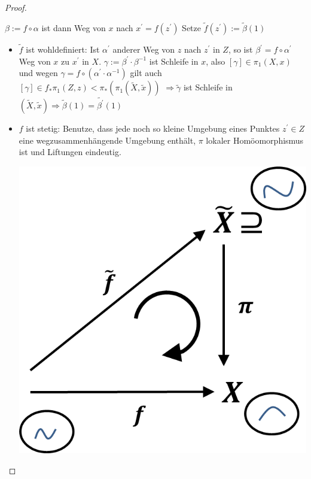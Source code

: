 \documentclass[a4paper,11pt,notitlepage]{report}
\theoremstyle{definition}
\begin{document}
\begin{proof}
\begin{center}
	 \end{center}
	$\beta := f \circ \alpha$ ist dann Weg von $x$ nach $x^\prime = f(z^\prime)$ \newline
	Setze $\widetilde{f}(z^\prime) := \widetilde{\beta}(1)$
	\begin{itemize}
	\item $\widetilde{f}$ ist wohldefiniert: Ist $\alpha^\prime$ anderer Weg von $z$ nach $z^\prime$ in $Z$, so ist $\beta^\prime = f \circ \alpha^\prime$ Weg von $x$ zu $x^\prime$ in $X$.
	\newline
	$\gamma := \beta^\prime \cdot \beta^{-1}$ ist Schleife in $x$, also $[\gamma] \in \pi_1(X,x)$ und wegen $\gamma = f \circ (\alpha^\prime \cdot \alpha^{-1})$ gilt auch $[\gamma] \in f_* \pi_1(Z,z) < \pi_*(\pi_1(\widetilde{X},\widetilde{x}))$
	\newline
	$\Rightarrow \widetilde{\gamma}$ ist Schleife in $(\widetilde{X}, \widetilde{x}) \Rightarrow \widetilde{\beta}(1) = \widetilde{\beta^\prime}(1)$
	\item $f$ ist stetig: Benutze, dass jede noch so kleine Umgebung eines Punktes $z^\prime \in Z$ eine wegzusammenhängende Umgebung enthält, $\pi$ lokaler Homöomorphismus ist und Liftungen eindeutig. \begin{center}
	 	\includegraphics[scale=0.5]{images/2011_12_22_Bild3.png}
	 \end{center}
	\end{itemize}
\end{proof}
\end{document}
